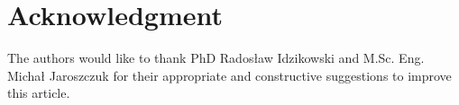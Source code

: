 \section*{Acknowledgment}

The authors would like to thank PhD Radosław Idzikowski and M.Sc. Eng. Michał Jaroszczuk for their appropriate and constructive suggestions to improve this article.


